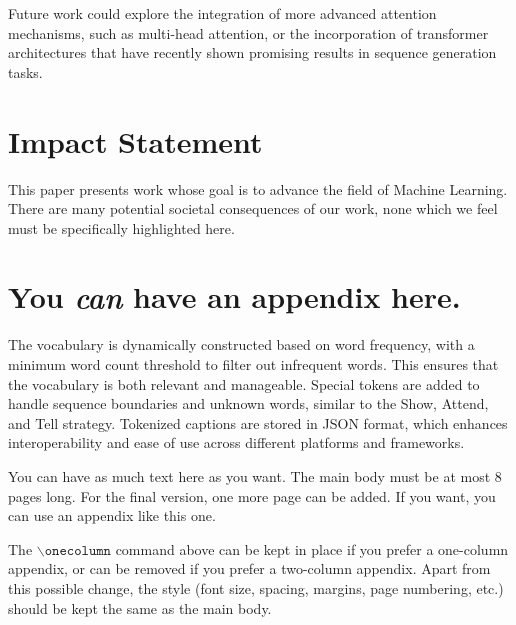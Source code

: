 \documentclass{article}
\theoremstyle{plain}
\theoremstyle{definition}
\theoremstyle{remark}
\begin{document}
Future work could explore the integration of more advanced attention mechanisms, such as multi-head attention, or the incorporation of transformer architectures that have recently shown promising results in sequence generation tasks.

\section*{Impact Statement}

This paper presents work whose goal is to advance the field of Machine Learning. There are many potential societal consequences of our work, none which we feel must be specifically highlighted here.





\newpage
\appendix
\onecolumn
\section{You \emph{can} have an appendix here.}


The vocabulary is dynamically constructed based on word frequency, with a minimum word count threshold to filter out infrequent words. This ensures that the vocabulary is both relevant and manageable. Special tokens are added to handle sequence boundaries and unknown words, similar to the Show, Attend, and Tell strategy. Tokenized captions are stored in JSON format, which enhances interoperability and ease of use across different platforms and frameworks.

You can have as much text here as you want. The main body must be at most $8$ pages long.
For the final version, one more page can be added.
If you want, you can use an appendix like this one.  

The $\mathtt{\backslash onecolumn}$ command above can be kept in place if you prefer a one-column appendix, or can be removed if you prefer a two-column appendix.  Apart from this possible change, the style (font size, spacing, margins, page numbering, etc.) should be kept the same as the main body.
\end{document}

